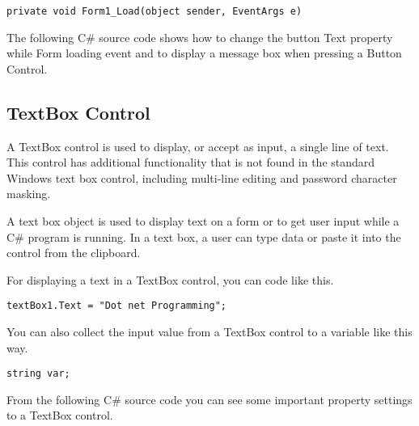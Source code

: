 \begin{lstlisting}[numbers=none]
private void Form1_Load(object sender, EventArgs e)
\end{lstlisting}

The following C\# source code shows how to change the button Text property while Form loading event and to display a message box when pressing a Button Control.




\subsection{TextBox Control}
A TextBox control is used to display, or accept as input, a single line of text. This control has additional functionality that is not found in the standard Windows text box control, including multi-line editing and password character masking.

A text box object is used to display text on a form or to get user input while a C\# program is running. In a text box, a user can type data or paste it into the control from the clipboard.

For displaying a text in a TextBox control, you can code like this.

\begin{lstlisting}[numbers=none]
textBox1.Text = "Dot net Programming";
\end{lstlisting}	

You can also collect the input value from a TextBox control to a variable like this way.	
\begin{lstlisting}[numbers=none]
string var;
\end{lstlisting}

From the following C\# source code you can see some important property settings to a TextBox control.



